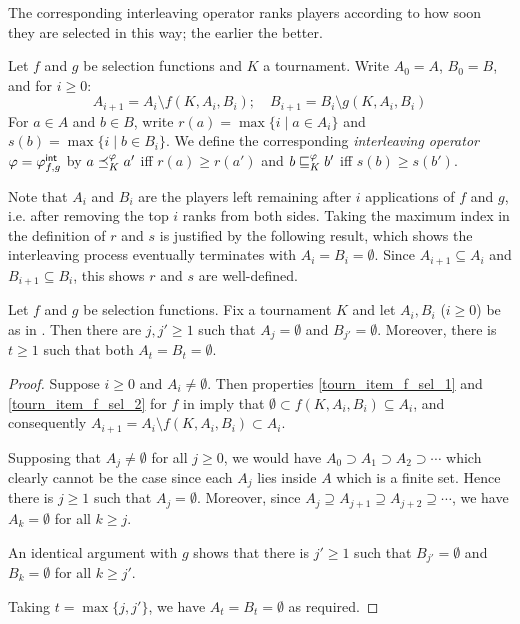 The corresponding interleaving operator ranks players according to how soon
they are selected in this way; the earlier the better.

\begin{definition}%
    \label{tourn_def_interleaving}

    Let $f$ and $g$ be selection functions and $K$ a tournament. Write $A_0
    = A$, $B_0 = B$, and for $i \ge 0$:
    \[
        A_{i+1} = A_i \setminus f(K, A_i, B_i);
        \quad
        B_{i+1} = B_i \setminus g(K, A_i, B_i)
    \]
    For $a \in A$ and $b \in B$, write $r(a) = \max{\{ i \mid a \in A_i \}}$
    and $s(b) = \max{\{ i \mid b \in B_i \}}$. We define the
    corresponding \emph{interleaving operator} $\varphi = {\varphi_{f,g}^\mathsf{int}}$ by $a
    \preceq_K^\varphi a'$ iff $r(a) \ge r(a')$ and $b \sqsubseteq_K^\varphi b'$ iff $s(b) \ge
    s(b')$.

\end{definition}

Note that $A_i$ and $B_i$ are the players left remaining after $i$ applications
of $f$ and $g$, i.e. after removing the top $i$ ranks from both sides. Taking
the maximum index in the definition of $r$ and $s$ is justified by the
following result, which shows the interleaving process eventually terminates
with $A_i = B_i = \emptyset$. Since $A_{i + 1} \subseteq A_i$ and $B_{i + 1}
\subseteq B_i$, this shows $r$ and $s$ are well-defined.

\begin{proposition}
    \label{tourn_prop_interleaving_terminates}

    Let $f$ and $g$ be selection functions. Fix a tournament $K$ and let $A_i,
    B_i$ ($i \ge 0$) be as in . Then there are $j, j'
    \ge 1$ such that $A_j = \emptyset$ and $B_{j'} = \emptyset$. Moreover,
    there is $t \ge 1$ such that both $A_t = B_t = \emptyset$.

\end{proposition}

\begin{proof}

    Suppose $i \ge 0$ and $A_i \ne \emptyset$. Then properties
    \cref{tourn_item_f_sel_1} and \cref{tourn_item_f_sel_2} for $f$ in
     imply that $\emptyset \subset f(K, A_i, B_i)
    \subseteq A_i$, and consequently $A_{i+1} = A_i \setminus f(K, A_i, B_i)
    \subset A_i$.

    Supposing that $A_j \ne \emptyset$ for all $j \ge 0$, we would have $A_0
    \supset A_1 \supset A_2 \supset \cdots$ which clearly cannot be the case
    since each $A_j$ lies inside $A$ which is a finite set. Hence there is $j
    \ge 1$ such that $A_j = \emptyset$. Moreover, since $A_j \supseteq A_{j+1}
    \supseteq A_{j+2} \supseteq \cdots$, we have $A_k = \emptyset$ for all $k
    \ge j$.

    An identical argument with $g$ shows that there is $j' \ge 1$ such that
    $B_{j'} = \emptyset$ and $B_k = \emptyset$ for all $k \ge j'$.

    Taking $t = \max\{j, j'\}$, we have $A_t = B_t = \emptyset$ as required.
\end{proof}

